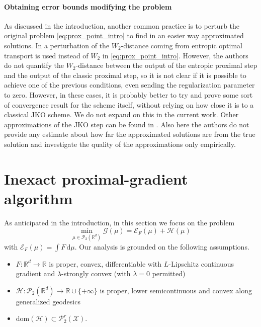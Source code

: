 \documentclass[11pt]{article}
\newcommand{\cP}{\mathcal{P}}
\newcommand{\cG}{\mathcal{G}}
\newcommand{\R}{\mathbb{R}}
\numberwithin{equation}{section}
\begin{document}
\paragraph{Obtaining error bounds modifying the problem} As discussed in the introduction, another common practice is to perturb the original problem \eqref{eq:prox_point_intro} to find in an easier way approximated solutions. In \cite{CDPS17} a perturbation of the $W_2$-distance coming from entropic optimal transport \cite{Cuturi2013} is used instead of $W_2$ in \eqref{eq:prox_point_intro}. However, the authors do not quantify the $W_2$-distance between the output of the entropic proximal step and the output of the classic proximal step, so it is not clear if it is possible to achieve one of the previous conditions, even sending the regularization parameter to zero. However, in these cases, it is probably better to try and prove some sort of convergence result for the scheme itself, without relying on how close it is to a classical JKO scheme. We do not expand on this in the current work. Other approximations of the JKO step can be found in \cite{LLO23, LLW20, LWL24}. Also here the authors do not provide any estimate about how far the approximated solutions are from the true solution and investigate the quality of the approximations only empirically.


\section{Inexact proximal-gradient algorithm}\label{sec:PG}
As anticipated in the introduction, in this section we focus on the problem
	\begin{equation}
		\label{eq:psum}
		\min_{\mu\in\cP_2(\R^d)} \cG (\mu) = \mathcal{E}_F(\mu)+\mathcal{H}(\mu)
	\end{equation}
	with $\mathcal{E}_F(\mu)= \int F \, \mathrm{d}\mu$. Our analysis is grounded on the following assumptions.
	
	\smallskip
	
	\begin{itemize}
		\item[\textbf{(A1)}]\label{A1} $F\colon\R^d\to\R$ is proper, convex, differentiable with $L$-Lipschitz continuous gradient and $\lambda$-strongly convex (with $\lambda=0$ permitted)
		\item[\textbf{(A2)}] $\mathcal{H}\colon \cP_2(\R^d)\to\R \cup \{+\infty\}$ is proper, lower semicontinuous and convex along generalized geodesics
		\item[\textbf{(A3)}] $\text{dom}(\mathcal{H})\subset \cP_2^r(\mathcal{X})$.
	\end{itemize}
	
\end{document}
